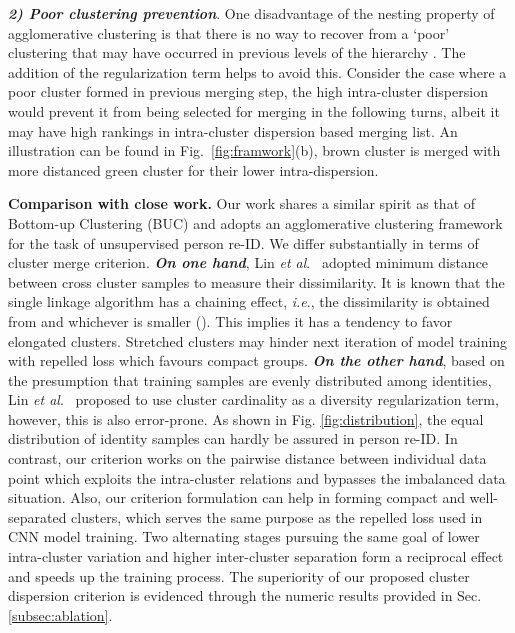\documentclass[journal]{IEEEtran}
\newcommand{\etal}{\textit{et al}.}
\newcommand{\ie}{\textit{i.e}.}
\begin{document}
\textbf{{\em 2) Poor clustering prevention}}. One disadvantage of the nesting property of agglomerative clustering is that there is no way to recover from a `poor' clustering that may have occurred in previous levels of the hierarchy \cite{gower1967comparison}. The addition of the regularization term helps to avoid this. Consider the case where a poor cluster formed in previous merging step, the high intra-cluster dispersion would prevent it from being selected for merging in the following turns, albeit it may have high rankings in intra-cluster dispersion based merging list. An illustration can be found in Fig.~\ref{fig:framwork}(b), brown cluster is merged with more distanced green cluster for their lower intra-dispersion.

\textbf{Comparison with close work.}
Our work shares a similar spirit as that of Bottom-up Clustering (BUC) \cite{lin2019bottom} and adopts an agglomerative clustering framework for the task of unsupervised person re-ID. We differ substantially in terms of cluster merge criterion. \textbf{\textit{On one hand}}, Lin \etal\ \cite{lin2019bottom} adopted minimum distance between cross cluster samples to measure their dissimilarity. It is known that the single linkage algorithm has a chaining effect, \ie, the dissimilarity  is obtained from  and  whichever is smaller (). This implies it has a tendency to favor elongated clusters. Stretched clusters may hinder next iteration of model training with repelled loss which favours compact groups. \textbf{\textit{On the other hand}}, based on the presumption that training samples are evenly distributed among identities, Lin \etal\ \cite{lin2019bottom} proposed to use cluster cardinality as a diversity regularization term, however, this is also error-prone. As shown in Fig. \ref{fig:distribution}, the equal distribution of identity samples can hardly be assured in person re-ID. In contrast, our criterion works on the pairwise distance between individual data point which exploits the intra-cluster relations and bypasses the imbalanced data situation. Also, our criterion formulation can help in forming compact and well-separated clusters, which serves the same purpose as the repelled loss used in CNN model training. Two alternating stages pursuing the same goal of lower intra-cluster variation and higher inter-cluster separation form a reciprocal effect and speeds up the training process. The superiority of our proposed cluster dispersion criterion is evidenced through the numeric results provided in Sec. \ref{subsec:ablation}. 
\end{document}
